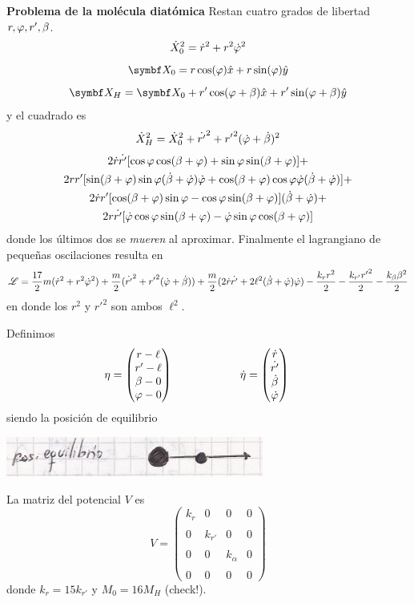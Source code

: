 \documentclass[10pt,oneside]{CBFT_book}
\begin{document}
\begin{ejemplo}{\bf Problema de la molécula diatómica}
Restan cuatro grados de libertad $r, \varphi, r', \beta$.
\[
	\dot{X}_0^2 = \dot{r}^2 + r^2 \dot{\varphi}^2
\]
\[
	\vb{X}_0 = r \cos (\vp) \hat{x} + r \sin (\vp) \hat{y}
\]
\[
	\vb{X}_H = \vb{X}_0 + r' \cos (\vp + \beta) \hat{x} + r' \sin (\vp + \beta) \hat{y}
\]
y el cuadrado es
\[
	\dot{X}_H^2 = \dot{X}_0^2 + \dot{r'}^2 + {r'}^2 ( \dot{\varphi} + \dot{\beta} )^2
\]
\begin{multline}
	2 \dot{r} \dot{r'} [ \cos \varphi \cos (\beta + \varphi) + \sin\varphi \sin(\beta + \varphi) ] + \\
	2 {r} {r'} [ \sin(\beta + \varphi) \sin\varphi (\dot{\beta} + \dot{\varphi}) \dot{\varphi} + \cos(\beta + \varphi) \cos\varphi \dot{\varphi} (\dot{\beta} + \dot{\varphi}) ] + \\
	2 \dot{r} {r'} [ \cos (\beta + \varphi) \sin \varphi - \cos \varphi \sin (\beta + \varphi)] (\dot{\beta} + \dot{\varphi}) + \\
	2 {r} \dot{r'} [ \dot{\varphi} \cos\varphi \sin(\beta + \varphi) - \dot{\varphi} \sin\varphi \cos (\beta + \varphi)] 
\end{multline}
donde los últimos dos se {\it mueren} al aproximar.
Finalmente el lagrangiano de pequeñas oscilaciones resulta en
\[
	\mathscr{L} = \frac {17} 2 m ( \dot{r}^2 + r^2 \dot{\varphi}^2 ) + 
	\frac m 2 ( \dot{r'}^2 + {r'}^2( \dot{\varphi} + \dot{\beta} ) ) +
	\frac m 2 ( 2 \dot{r} \dot{r'} + 2 \ell^2 ( \dot{\beta} + \dot{\varphi} ) \dot{\varphi} ) - 
	\frac{k_r r^2}{2} - \frac{k_{r'} {r'}^2}{2} - \frac{k_\beta \beta^2}{2}
\]
en donde los $r^2$ y ${r'}^2$ son ambos $\ell^2$.

Definimos
\[
	\eta = \begin{pmatrix}
	       r - \ell \\
	       r' - \ell \\
	       \beta - 0 \\
	       \varphi - 0
	      \end{pmatrix} \qquad     
	\qquad  \qquad 
	\dot{\eta} = \begin{pmatrix}
	       \dot{r} \\
	       \dot{r'} \\
	       \dot{\beta} \\
	       \dot{\varphi}
	      \end{pmatrix} \qquad 
\]
siendo la posición de equilibrio 

\includegraphics[scale=0.5]{images/fig_mc_molecula_4.jpg}

La matriz del potencial $V$ es 
\[
	V =  \begin{pmatrix}
		k_r	 &	0	&	0	&	0	\\
		\\
		0 	&	k_{r'} 	&	0	&	0	\\
		\\
		0	&	0	&	k_{\alpha}  &	0  \\
		\\
		0	&	0	&	0  	&   0
	    \end{pmatrix}
\]
donde $k_r = 15 k_{r'}$ y $M_0 = 16 M_H$ (check!).


\end{ejemplo}
\end{document}
